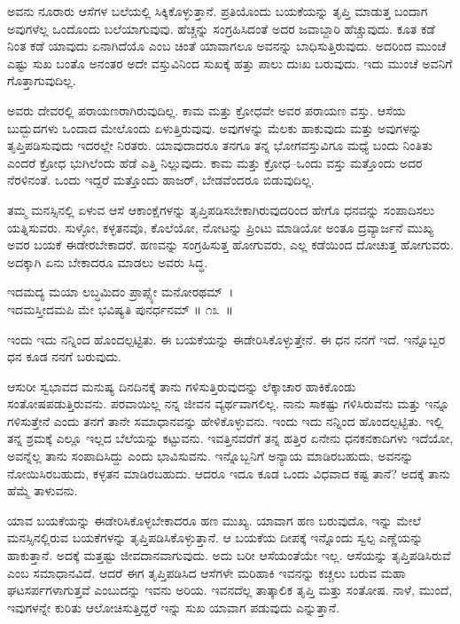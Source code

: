 ಅವನು ನೂರಾರು ಆಸೆಗಳ ಬಲೆಯಲ್ಲಿ ಸಿಕ್ಕಿಕೊಳ್ಳುತ್ತಾನೆ. ಪ್ರತಿಯೊಂದು ಬಯಕೆಯನ್ನು ತೃಪ್ತಿ ಮಾಡುತ್ತ ಬಂದಾಗ ಅವುಗಳೆಲ್ಲ ಒಂದೊಂದು ಬಲೆಯಾಗುವುವು. ಹೆಚ್ಚನ್ನು ಸಂಗ್ರಹಿಸಿದಂತೆ ಅದರ ಜವಾಬ್ದಾರಿ ಹೆಚ್ಚುವುದು. ಕೂತ ಕಡೆ ನಿಂತ ಕಡೆ ಯಾವುದು ಏನಾಗಿದೆಯೊ ಎಂಬ ಚಿಂತೆ ಯಾವಾಗಲೂ ಅವನನ್ನು ಬಾಧಿಸುತ್ತಿರುವುದು. ಅದರಿಂದ ಮುಂಚೆ ಎಷ್ಟು ಸುಖ ಬಂತೊ ಅನಂತರ ಅದೇ ವಸ್ತುವಿನಿಂದ ಸುಖಕ್ಕೆ ಹತ್ತು ಪಾಲು ದುಃಖ ಬರುವುದು. ಇದು ಮುಂಚೆ ಅವನಿಗೆ ಗೊತ್ತಾಗುವುದಿಲ್ಲ.

ಅವರು ದೇವರಲ್ಲಿ ಪರಾಯಣರಾಗಿರುವುದಿಲ್ಲ. ಕಾಮ ಮತ್ತು ಕ್ರೋಧವೇ ಅವರ ಪರಾಯಣ ವಸ್ತು. ಆಸೆಯ ಬುದ್ಬುದಗಳು ಒಂದಾದ ಮೇಲೊಂದು ಏಳುತ್ತಿರುವುವು. ಅವುಗಳನ್ನು ಮೆಲಕು ಹಾಕುವುದು ಮತ್ತು ಅವುಗಳನ್ನು ತೃಪ್ತಿಪಡಿಸುವುದು ಇದರಲ್ಲೇ ನಿರತರು. ಯಾವುದಾದರೂ ತನಗೂ ತನ್ನ ಭೋಗವಸ್ತುವಿಗೂ ಮಧ್ಯೆ ಬಂದು ನಿಂತಿತು ಎಂದರೆ ಕ್ರೋಧ ಭುಗಿಲೆಂದು ಹೆಡೆ ಎತ್ತಿ ನಿಲ್ಲುವುದು. ಕಾಮ ಮತ್ತು ಕ್ರೋಧ–ಒಂದು ವಸ್ತು ಮತ್ತೊಂದು ಅದರ ನೆರಳಿನಂತೆ. ಒಂದು ಇದ್ದರೆ ಮತ್ತೊಂದು ಹಾಜರ್, ಬೇಡವೆಂದರೂ ಬಿಡುವುದಿಲ್ಲ.

ತಮ್ಮ ಮನಸ್ಸಿನಲ್ಲಿ ಏಳುವ ಆಸೆ ಆಕಾಂಕ್ಷೆಗಳನ್ನು ತೃಪ್ತಿಪಡಿಸಬೇಕಾಗಿರುವುದರಿಂದ ಹೇಗೊ ಧನವನ್ನು ಸಂಪಾದಿಸಲು ಯತ್ನಿಸುವರು. ಸುಳ್ಳೋ, ಕಳ್ಳತನವೊ, ಕೊಲೆಯೋ, ನೋಟನ್ನು ಪ್ರಿಂಟು ಮಾಡಿಯೋ ಅಂತೂ ದ್ರವ್ಯಾರ್ಜನೆ ಮುಖ್ಯ ಅವರ ಬಯಕೆ ಈಡೇರಬೇಕಾದರೆ. ಹಣವನ್ನು ಸಂಗ್ರಹಿಸುತ್ತ ಹೋಗುವರು, ಎಲ್ಲ ಕಡೆಯಿಂದ ದೋಚುತ್ತ ಹೋಗುವರು. ಅದಕ್ಕಾಗಿ ಏನು ಬೇಕಾದರೂ ಮಾಡಲು ಅವರು ಸಿದ್ಧ.

\begin{shloka}
ಇದಮದ್ಯ ಮಯಾ ಲಬ್ಧಮಿದಂ ಪ್ರಾಪ್ಸ್ಯೇ ಮನೋರಥಮ್~।\\ಇದಮಸ್ತೀದಮಪಿ ಮೇ ಭವಿಷ್ಯತಿ ಪುನರ್ಧನಮ್ \hfill॥ ೧೩~॥
\end{shloka}

\begin{artha}
ಇಂದು ಇದು ನನ್ನಿಂದ ಹೊಂದಲ್ಪಟ್ಟಿತು. ಈ ಬಯಕೆಯನ್ನು ಈಡೇರಿಸಿಕೊಳ್ಳುತ್ತೇನೆ. ಈ ಧನ ನನಗೆ ಇದೆ. ಇನ್ನೊಬ್ಬರ ಧನ ಕೂಡ ನನಗೆ ಬರುವುದು.
\end{artha}

ಆಸುರೀ ಸ್ವಭಾವದ ಮನುಷ್ಯ ದಿನದಿನಕ್ಕೆ ತಾನು ಗಳಿಸುತ್ತಿರುವುದನ್ನು ಲೆಕ್ಕಾಚಾರ ಹಾಕಿಕೊಂಡು ಸಂತೋಷಪಡುತ್ತಿರುವನು. ಪರವಾಯಿಲ್ಲ ನನ್ನ ಜೀವನ ವ್ಯರ್ಥವಾಗಲಿಲ್ಲ. ನಾನು ಸಾಕಷ್ಟು ಗಳಿಸಿರುವೆನು ಮತ್ತು ಇನ್ನೂ ಗಳಿಸುತ್ತೇನೆ ಎಂದು ತನಗೆ ತಾನೇ ಸಮಾಧಾನವನ್ನು ಹೇಳಿಕೊಳ್ಳುವನು. ಇಂದು ಇದು ನನ್ನಿಂದ ಹೊಂದಲ್ಪಟ್ಟಿತು. ಇಲ್ಲಿ ತನ್ನ ಶ್ರಮಕ್ಕೆ ಎಲ್ಲೂ ಇಲ್ಲದ ಬೆಲೆಯನ್ನು ಕಟ್ಟುವನು. ಇವತ್ತಿನವರೆಗೆ ತನ್ನ ಹತ್ತಿರ ಏನೇನು ಧನಕನಕಾದಿಗಳು ಇದೆಯೋ, ಅವನ್ನೆಲ್ಲ ತಾನು ಸಂಪಾದಿಸಿದ್ದು ಎಂದು ಭಾವಿಸುವನು. ಇನ್ನೊಬ್ಬನಿಗೆ ಅನ್ಯಾಯ ಮಾಡಿರಬಹುದು, ಅವನನ್ನು ನೋಯಿಸಿರಬಹುದು, ಕಳ್ಳತನ ಮಾಡಿರಬಹುದು. ಆದರೂ ಇದೂ ಕೂಡ ಒಂದು ವಿಧವಾದ ಕಷ್ಟ ತಾನೆ? ಅದಕ್ಕೆ ತಾನು ಹೆಮ್ಮೆ ತಾಳುವನು.

ಯಾವ ಬಯಕೆಯನ್ನು ಈಡೇರಿಸಿಕೊಳ್ಳಬೇಕಾದರೂ ಹಣ ಮುಖ್ಯ. ಯಾವಾಗ ಹಣ ಬರುವುದೊ, ಇನ್ನು ಮೇಲೆ ಮನಸ್ಸಿನಲ್ಲಿರುವ ಬಯಕೆಗಳನ್ನು ತೃಪ್ತಿಪಡಿಸಿಕೊಳ್ಳುತ್ತಾನೆ. ಆ ಬಯಕೆಯ ದೀಪಕ್ಕೆ ಇನ್ನೊಂದು ಸ್ವಲ್ಪ ಎಣ್ಣೆಯನ್ನು ಹಾಕುತ್ತಾನೆ. ಅದಕ್ಕೆ ಮತ್ತಷ್ಟು ಜೀವದಾನವಾಗುವುದು. ಅದು ಬರೀ ಆಸೆಯಂತೆಯೇ ಇಲ್ಲ. ಆಸೆಯನ್ನು ತೃಪ್ತಿಪಡಿಸಿರುವೆ ಎಂಬ ಸಮಾಧಾನವಿದೆ. ಆದರೆ ಈಗ ತೃಪ್ತಿಪಡಿಸಿದ ಆಸೆಗಳೇ ಮರಿಹಾಕಿ ಇವನನ್ನು ಕಚ್ಚಲು ಬರುವ ಮಹಾ ಘಟಸರ್ಪಗಳಾಗುತ್ತವೆ ಎಂಬುದನ್ನು ಇವನು ಅರಿಯ. ಇವನದೆಲ್ಲ ತಾತ್ಕಾಲಿಕ ತೃಪ್ತಿ ಮತ್ತು ಸಂತೋಷ. ನಾಳೆ, ಮುಂದೆ, ಇವುಗಳನ್ನೇ ಕುರಿತು ಆಲೋಚಿಸುತ್ತಿದ್ದರೆ ಇನ್ನು ಸುಖ ಯಾವಾಗ ಪಡುವುದು ಎನ್ನುತ್ತಾನೆ.

